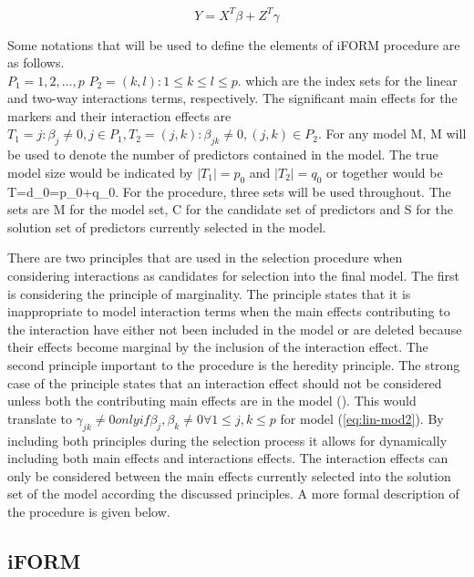 \documentclass[11pt,]{book}
\theoremstyle{definition}
\theoremstyle{definition}
\theoremstyle{remark}
\begin{document}
\begin{equation}
Y = X^T \beta + Z^T \gamma
\label{eq:lin-mod3}
\end{equation}

Some notations that will be used to define the elements of
\cite{hao2014interaction} iFORM procedure are as follows.\\
\(P_1 = {1,2,\dots,p}\) \(P_2 = {(k,l):1 \le k \le l \le p}\). which are
the index sets for the linear and two-way interactions terms,
respectively. The significant main effects for the markers and their
interaction effects are
\(T_1 = {j:\beta_j \ne 0,j\in P_1},T_2 = {(j,k):\beta_{jk} \ne 0,(j,k) \in P_2}\).
For any model M, \textbar{}M\textbar{} will be used to denote the number
of predictors contained in the model. The true model size would be
indicated by \(|T_1| = p_0\) and \(|T_2| = q_0\) or together would be
\textbar{}T\textbar{}=d\_0=p\_0+q\_0. For the procedure, three sets will
be used throughout. The sets are M for the model set, C for the
candidate set of predictors and S for the solution set of predictors
currently selected in the model.

There are two principles that are used in the selection procedure when
considering interactions as candidates for selection into the final
model. The first is considering the principle of marginality. The
principle states that it is inappropriate to model interaction terms
when the main effects contributing to the interaction have either not
been included in the model or are deleted because their effects become
marginal by the inclusion of the interaction effect. The second
principle important to the procedure is the heredity principle. The
strong case of the principle states that an interaction effect should
not be considered unless both the contributing main effects are in the
model (\cite{zhao2006model}). This would translate to
\(\gamma_{jk} ≠ 0 only if \beta_j, \beta_k \ne 0 \forall 1 ≤ j, k ≤ p\)
for model (\eqref{eq:lin-mod2}). By including both principles during the
selection process it allows for dynamically including both main effects
and interactions effects. The interaction effects can only be considered
between the main effects currently selected into the solution set of the
model according the discussed principles. A more formal description of
the procedure is given below.

\subsection{iFORM}\label{iform}
\end{document}
